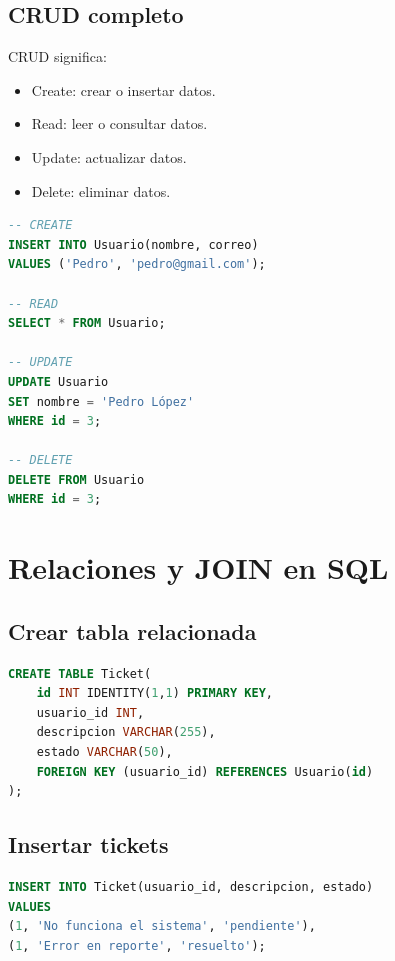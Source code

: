 \documentclass[12pt]{article}
\begin{document}
\subsection{CRUD completo}

CRUD significa:

\begin{itemize}
    \item Create: crear o insertar datos.
    \item Read: leer o consultar datos.
    \item Update: actualizar datos.
    \item Delete: eliminar datos.
\end{itemize}

\begin{lstlisting}[language=SQL]
-- CREATE
INSERT INTO Usuario(nombre, correo)
VALUES ('Pedro', 'pedro@gmail.com');

-- READ
SELECT * FROM Usuario;

-- UPDATE
UPDATE Usuario
SET nombre = 'Pedro López'
WHERE id = 3;

-- DELETE
DELETE FROM Usuario
WHERE id = 3;
\end{lstlisting}

\section{Relaciones y JOIN en SQL}

\subsection{Crear tabla relacionada}

\begin{lstlisting}[language=SQL]
CREATE TABLE Ticket(
    id INT IDENTITY(1,1) PRIMARY KEY,
    usuario_id INT,
    descripcion VARCHAR(255),
    estado VARCHAR(50),
    FOREIGN KEY (usuario_id) REFERENCES Usuario(id)
);
\end{lstlisting}

\subsection{Insertar tickets}

\begin{lstlisting}[language=SQL]
INSERT INTO Ticket(usuario_id, descripcion, estado)
VALUES
(1, 'No funciona el sistema', 'pendiente'),
(1, 'Error en reporte', 'resuelto');
\end{lstlisting}
\end{document}
